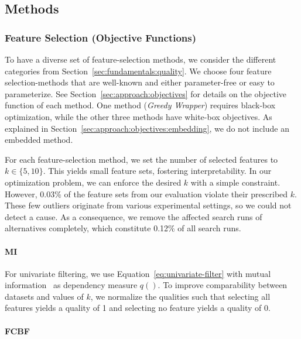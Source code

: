 \documentclass[conference]{IEEEtran}
\theoremstyle{definition}
\begin{document}
\subsection{Methods}
\label{sec:experimental-design:approaches}

\subsubsection{Feature Selection (Objective Functions)}
\label{sec:experimental-design:approaches:feature-selection}

To have a diverse set of feature-selection methods, we consider the different categories from Section~\ref{sec:fundamentals:quality}.
We choose four feature selection-methods that are well-known and either parameter-free or easy to parameterize.
See Section~\ref{sec:approach:objectives} for details on the objective function of each method.
One method (\emph{Greedy Wrapper}) requires black-box optimization, while the other three methods have white-box objectives.
As explained in Section~\ref{sec:approach:objectives:embedding}, we do not include an embedded method.

For each feature-selection method, we set the number of selected features to $k \in \{5,10\}$.
This yields small feature sets, fostering interpretability.
In our optimization problem, we can enforce the desired $k$ with a simple constraint.
However, 0.03\% of the feature sets from our evaluation violate their prescribed $k$.
These few outliers originate from various experimental settings, so we could not detect a cause.
As a consequence, we remove the affected search runs of alternatives completely, which constitute 0.12\% of all search runs.

\paragraph{MI}

For univariate filtering, we use Equation~\ref{eq:univariate-filter} with mutual information~\cite{kraskov2004estimating} as dependency measure $q()$.
To improve comparability between datasets and values of $k$, we normalize the qualities such that selecting all features yields a quality of 1 and selecting no feature yields a quality of 0.

\paragraph{FCBF}
\end{document}
